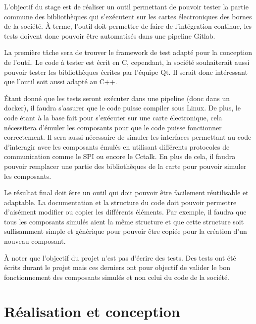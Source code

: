 \documentclass[a4paper]{article}
\begin{document}
L'objectif du stage est de réaliser un outil permettant de pouvoir tester la
partie commune des bibliothèques qui s'exécutent sur les cartes électroniques
des bornes de la société. À terme, l'outil doit permettre de faire de
l'intégration continue, les tests doivent donc pouvoir être automatisés dans une
pipeline Gitlab.

La première tâche sera de trouver le framework de test adapté pour la conception
de l'outil. Le code à tester est écrit en C, cependant, la société souhaiterait
aussi pouvoir tester les bibliothèques écrites par l'équipe Qt. Il serait donc
intéressant que l'outil soit aussi adapté au C++.

Étant donné que les tests seront exécuter dans une pipeline (donc dans un
docker), il faudra s'assurer que le code puisse compiler sous Linux. De plus, le
code étant à la base fait pour s'exécuter sur une carte électronique, cela
nécessitera d'émuler les composants pour que le code puisse fonctionner
correctement. Il sera aussi nécessaire de simuler les interfaces permettant au
code d'interagir avec les composants émulés en utilisant différents protocoles
de communication comme le SPI ou encore le Cctalk. En plus de cela, il faudra
pouvoir remplacer une partie des bibliothèques de la carte pour pouvoir simuler
les composants.

Le résultat final doit être un outil qui doit pouvoir être facilement
réutilisable et adaptable. La documentation et la structure du code doit pouvoir
permettre d'aisément modifier ou copier les différents éléments. Par exemple, il
faudra que tous les composants simulés aient la même structure et que cette
structure soit suffisamment simple et générique pour pouvoir être copiée pour la
création d'un nouveau composant.

À noter que l'objectif du projet n'est pas d'écrire des tests. Des tests ont été
écrits durant le projet mais ces derniers ont pour objectif de valider le bon
fonctionnement des composants simulés et non celui du code de la société.


\clearpage
\part{Réalisation et conception}
\end{document}
